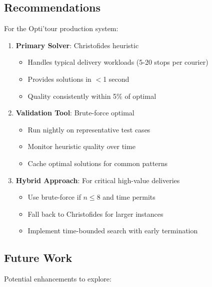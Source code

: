 \documentclass[9pt,a4paper,twoside]{tau}
\begin{document}
\subsection{Recommendations}

For the Opti'tour production system:

\begin{enumerate}
    \item \textbf{Primary Solver}: Christofides heuristic
    \begin{itemize}
        \item Handles typical delivery workloads (5-20 stops per courier)
        \item Provides solutions in $<$1 second
        \item Quality consistently within 5\% of optimal
    \end{itemize}
    
    \item \textbf{Validation Tool}: Brute-force optimal
    \begin{itemize}
        \item Run nightly on representative test cases
        \item Monitor heuristic quality over time
        \item Cache optimal solutions for common patterns
    \end{itemize}
    
    \item \textbf{Hybrid Approach}: For critical high-value deliveries
    \begin{itemize}
        \item Use brute-force if $n \leq 8$ and time permits
        \item Fall back to Christofides for larger instances
        \item Implement time-bounded search with early termination
    \end{itemize}
\end{enumerate}

\subsection{Future Work}

Potential enhancements to explore:
\end{document}
